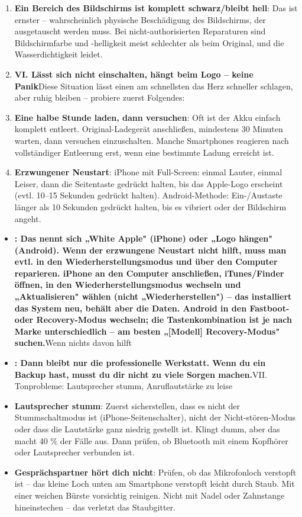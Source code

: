 \begin{enumerate}
  \item \textbf{Ein Bereich des Bildschirms ist komplett schwarz/bleibt hell}: Das ist ernster – wahrscheinlich physische Beschädigung des Bildschirms, der ausgetauscht werden muss. Bei nicht-authorisierten Reparaturen sind Bildschirmfarbe und -helligkeit meist schlechter als beim Original, und die Wasserdichtigkeit leidet.
  \item \textbf{VI. Lässt sich nicht einschalten, hängt beim Logo – keine Panik}Diese Situation lässt einen am schnellsten das Herz schneller schlagen, aber ruhig bleiben – probiere zuerst Folgendes:
  \item \textbf{Eine halbe Stunde laden, dann versuchen}: Oft ist der Akku einfach komplett entleert. Original-Ladegerät anschließen, mindestens 30 Minuten warten, dann versuchen einzuschalten. Manche Smartphones reagieren nach vollständiger Entleerung erst, wenn eine bestimmte Ladung erreicht ist.
  \item \textbf{Erzwungener Neustart}: iPhone mit Full-Screen: einmal Lauter, einmal Leiser, dann die Seitentaste gedrückt halten, bis das Apple-Logo erscheint (evtl. 10–15 Sekunden gedrückt halten). Android-Methode: Ein-/Austaste länger als 10 Sekunden gedrückt halten, bis es vibriert oder der Bildschirm angeht.
\end{enumerate}


\begin{itemize}
  \item \textbf{: Das nennt sich „White Apple" (iPhone) oder „Logo hängen" (Android). Wenn der erzwungene Neustart nicht hilft, muss man evtl. in den Wiederherstellungsmodus und über den Computer reparieren. iPhone an den Computer anschließen, iTunes/Finder öffnen, in den Wiederherstellungsmodus wechseln und „Aktualisieren" wählen (nicht „Wiederherstellen") – das installiert das System neu, behält aber die Daten. Android in den Fastboot- oder Recovery-Modus wechseln; die Tastenkombination ist je nach Marke unterschiedlich – am besten „[Modell] Recovery-Modus" suchen.}Wenn nichts davon hilft
  \item \textbf{: Dann bleibt nur die professionelle Werkstatt. Wenn du ein Backup hast, musst du dir nicht zu viele Sorgen machen.}VII. Tonprobleme: Lautsprecher stumm, Anruflautstärke zu leise
  \item \textbf{Lautsprecher stumm}: Zuerst sicherstellen, dass es nicht der Stummschaltmodus ist (iPhone-Seitenschalter), nicht der Nicht-stören-Modus oder dass die Lautstärke ganz niedrig gestellt ist. Klingt dumm, aber das macht 40 \% der Fälle aus. Dann prüfen, ob Bluetooth mit einem Kopfhörer oder Lautsprecher verbunden ist.
  \item \textbf{Gesprächspartner hört dich nicht}: Prüfen, ob das Mikrofonloch verstopft ist – das kleine Loch unten am Smartphone verstopft leicht durch Staub. Mit einer weichen Bürste vorsichtig reinigen. Nicht mit Nadel oder Zahnstange hineinstechen – das verletzt das Staubgitter.
\end{itemize}

